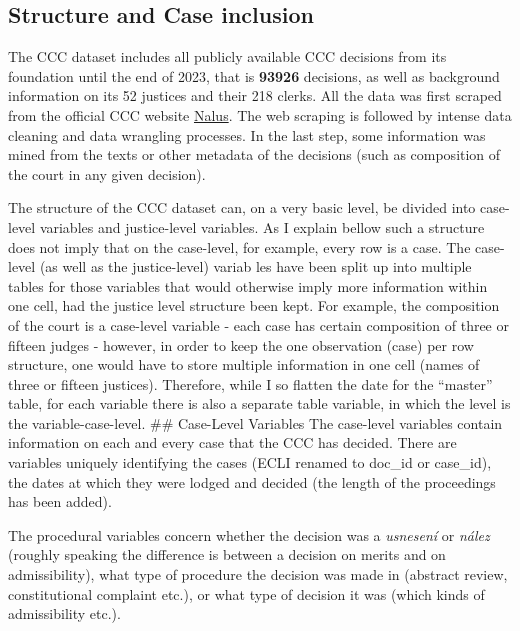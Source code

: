 \documentclass[
  11pt,
]{article}
\begin{document}
\hypertarget{structure-and-case-inclusion}{%
\subsection{Structure and Case
inclusion}\label{structure-and-case-inclusion}}

The CCC dataset includes all publicly available CCC decisions from its
foundation until the end of 2023, that is \textbf{93926} decisions, as
well as background information on its 52 justices and their 218 clerks.
All the data was first scraped from the official CCC website
\href{https://nalus.usoud.cz/Search/Search.aspx}{Nalus}. The web
scraping is followed by intense data cleaning and data wrangling
processes. In the last step, some information was mined from the texts
or other metadata of the decisions (such as composition of the court in
any given decision).

The structure of the CCC dataset can, on a very basic level, be divided
into case-level variables and justice-level variables. As I explain
bellow such a structure does not imply that on the case-level, for
example, every row is a case. The case-level (as well as the
justice-level) variab les have been split up into multiple tables for
those variables that would otherwise imply more information within one
cell, had the justice level structure been kept. For example, the
composition of the court is a case-level variable - each case has
certain composition of three or fifteen judges - however, in order to
keep the one observation (case) per row structure, one would have to
store multiple information in one cell (names of three or fifteen
justices). Therefore, while I so flatten the date for the ``master''
table, for each variable there is also a separate table variable, in
which the level is the variable-case-level. \#\# Case-Level Variables
The case-level variables contain information on each and every case that
the CCC has decided. There are variables uniquely identifying the cases
(ECLI renamed to doc\_id or case\_id), the dates at which they were
lodged and decided (the length of the proceedings has been added).

The procedural variables concern whether the decision was a
\emph{usnesení} or \emph{nález} (roughly speaking the difference is
between a decision on merits and on admissibility), what type of
procedure the decision was made in (abstract review, constitutional
complaint etc.), or what type of decision it was (which kinds of
admissibility etc.).
\end{document}
